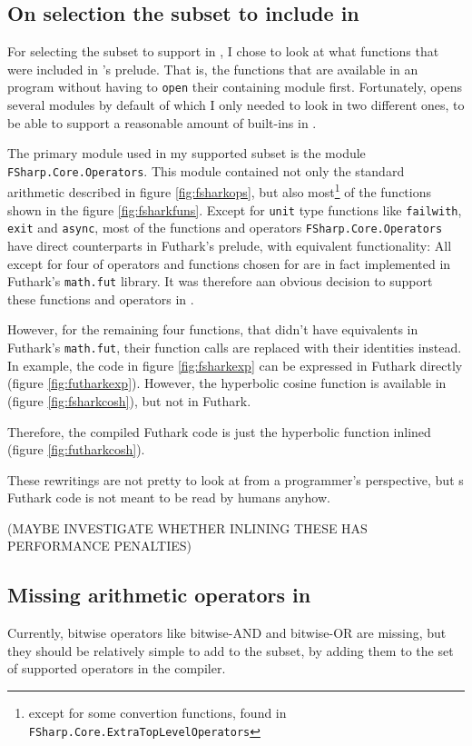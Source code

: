 \subsection{On selection the \fsharp{} subset to include in \fshark{}}
For selecting the \fsharp{} subset to support in \fshark{}, I chose to look at
what functions that were included in \fsharp{}'s prelude. That is, the
functions that are available in an \fsharp{} program without having to
\texttt{open} their containing module first.
Fortunately, \fsharp{} opens several modules by default of which I only
needed to look in two different ones, to be able to support a reasonable amount
of \fsharp{} built-ins in \fshark{}.

The primary module used in my supported \fsharp{} subset is the module
\texttt{FSharp.Core.Operators}.
This module contained not only the standard arithmetic described in figure
\ref{fig:fsharkops}, but also most\footnote{except for some convertion
  functions, found in \texttt{FSharp.Core.ExtraTopLevelOperators}} of the functions shown in the figure \ref{fig:fsharkfuns}.
Except for \texttt{unit} type functions like \texttt{failwith}, \texttt{exit}
and \texttt{async}, most of the functions and operators
\texttt{FSharp.Core.Operators} have direct counterparts in Futhark's prelude,
with equivalent functionality: All except for four of operators and functions chosen for
\fshark{} are in fact implemented in Futhark's \texttt{math.fut} library.
It was therefore aan obvious decision to support these functions and operators in
\fshark{}.

However, for the remaining four functions, that didn't have equivalents in
Futhark's \texttt{math.fut}, their function calls are replaced with their
identities instead.
In example, the \fshark{} code in figure \ref{fig:fsharkexp} can be
expressed in Futhark directly (figure \ref{fig:futharkexp}).
However, the hyperbolic cosine function is available in \fsharp{} (figure
\ref{fig:fsharkcosh}), but not in Futhark.

Therefore, the compiled \fshark{} Futhark code is just the hyperbolic function
inlined (figure \ref{fig:futharkcosh}).

These rewritings are not pretty to look at from a programmer's perspective, but
\fshark{}s Futhark code is not meant to be read by humans anyhow.

(MAYBE INVESTIGATE WHETHER INLINING THESE HAS PERFORMANCE PENALTIES) 

\subsection{Missing arithmetic operators in \fshark{}}
Currently, bitwise operators like bitwise-AND and bitwise-OR are missing, but
they should be relatively simple to add to the \fshark{} subset, by adding them
to the set of supported operators in the \fshark{} compiler.


